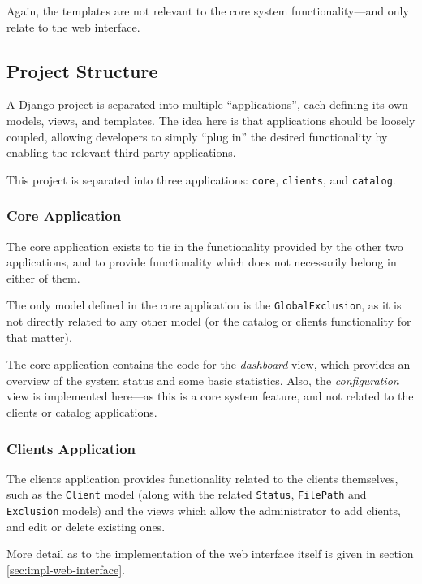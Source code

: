 Again, the templates are not relevant to the core system functionality---and
only relate to the web interface.

\subsection{Project Structure}

A Django project is separated into multiple ``applications'', each defining its
own models, views, and templates. The idea here is that applications should be
loosely coupled, allowing developers to simply ``plug in'' the desired
functionality by enabling the relevant third-party applications.

This project is separated into three applications: \verb!core!, \verb!clients!,
and \verb!catalog!.

\subsubsection{Core Application}

The core application exists to tie in the functionality provided by the other
two applications, and to provide functionality which does not necessarily
belong in either of them.

The only model defined in the core application is the \verb!GlobalExclusion!,
as it is not directly related to any other model (or the catalog or clients
functionality for that matter).

The core application contains the code for the \emph{dashboard} view, which
provides an overview of the system status and some basic statistics. Also, the
\emph{configuration} view is implemented here---as this is a core system
feature, and not related to the clients or catalog applications.

\subsubsection{Clients Application}

The clients application provides functionality related to the clients
themselves, such as the \verb!Client! model (along with the related
\verb!Status!, \verb!FilePath! and \verb!Exclusion! models) and the views which
allow the administrator to add clients, and edit or delete existing ones.

More detail as to the implementation of the web interface itself is given in
section \ref{sec:impl-web-interface}.

